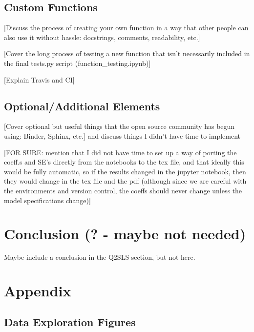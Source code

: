 \documentclass[12pt]{article}
\begin{document}
\subsection{Custom Functions}
\textcolor{BrickRed}{[Discuss the process of creating your own function in a way that other people can also use it without hassle: docstrings, comments, readability, etc.]}

\textcolor{BrickRed}{[Cover the long process of testing a new function that isn't necessarily included in the final tests.py script (function\_testing.ipynb)]}

\textcolor{BrickRed}{[Explain Travis and CI]}

\subsection{Optional/Additional Elements}
\textcolor{BrickRed}{[Cover optional but useful things that the open source community has begun using: Binder, Sphinx, etc.] and discuss things I didn't have time to implement}

\textcolor{BrickRed}{[FOR SURE: mention that I did not have time to set up a way of porting the coeff.s and SE's directly from the notebooks to the tex file, and that ideally this would be fully automatic, so if the results changed in the jupyter notebook, then they would change in the tex file and the pdf (although since we are careful with the environments and version control, the coeffs should never change unless the model specifications change)]}


\newpage
\section{Conclusion (? - maybe not needed)}
Maybe include a conclusion in the Q2SLS section, but not here.

\newpage
\section{Appendix}

\subsection{Data Exploration Figures}
\end{document}
